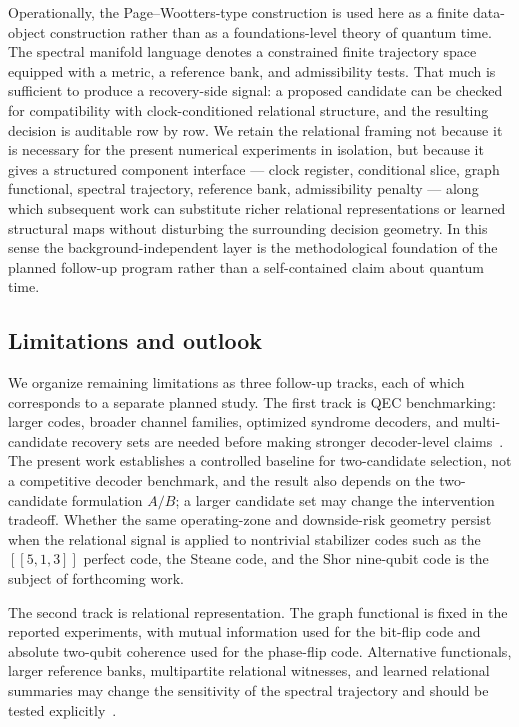 \documentclass{iopjournal}
\begin{document}
Operationally, the Page--Wootters-type construction is used here as a finite 
data-object construction rather than as a foundations-level theory of quantum 
time. The spectral manifold language denotes a constrained finite trajectory 
space equipped with a metric, a reference bank, and admissibility tests. That 
much is sufficient to produce a recovery-side signal: a proposed candidate can 
be checked for compatibility with clock-conditioned relational structure, and 
the resulting decision is auditable row by row. We retain the relational 
framing not because it is necessary for the present numerical experiments in 
isolation, but because it gives a structured component interface --- 
clock register, conditional slice, graph functional, spectral trajectory, 
reference bank, admissibility penalty --- along which subsequent work can 
substitute richer relational representations or learned structural maps 
without disturbing the surrounding decision geometry. In this sense the 
background-independent layer is the methodological foundation of the planned 
follow-up program rather than a self-contained claim about quantum time.

\subsection{Limitations and outlook}
\label{subsec:discussion-limitations}

We organize remaining limitations as three follow-up tracks, each of 
which corresponds to a separate planned study. The first track is QEC 
benchmarking: larger codes, broader channel families, optimized 
syndrome decoders, and multi-candidate recovery sets are needed before 
making stronger decoder-level 
claims~\cite{Asaka2026QuantumSpatialQEC,Filippov2024ScalabilityErrorMitigation,Li2025ZMixedAmplitudeDamping}. 
The present work establishes a controlled baseline for two-candidate 
selection, not a competitive decoder benchmark, and the result also 
depends on the two-candidate formulation $A/B$; a larger candidate set 
may change the intervention tradeoff. Whether the same operating-zone 
and downside-risk geometry persist when the relational signal is 
applied to nontrivial stabilizer codes such as the $[[5,1,3]]$ perfect 
code, the Steane code, and the Shor nine-qubit code is the subject of 
forthcoming work.

The second track is relational representation. The graph functional is fixed in
the reported experiments, with mutual information used for the bit-flip code and
absolute two-qubit coherence used for the phase-flip code. Alternative
functionals, larger reference banks, multipartite relational witnesses, and learned
relational summaries may change the sensitivity of the spectral trajectory and
should be tested
explicitly~\cite{Brito2020MultipartiteInterference,Huang2026QuantumSpectralPDEs,Alexeev2025AIQuantumComputing}.
\end{document}

